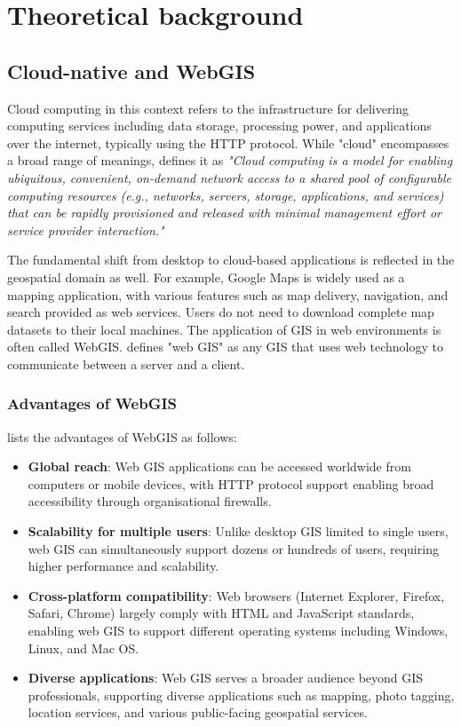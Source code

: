 \chapter{Theoretical background}
\label{chap:theoretical_background}

\section{Cloud-native and WebGIS}
\label{tb:cloud_native}

Cloud computing in this context refers to the infrastructure for delivering computing services including data storage, processing power, and applications over the internet, typically using the HTTP protocol. While "cloud" encompasses a broad range of meanings, \citet{nist_cloud_computing_2011} defines it as \emph{"Cloud computing is a model for enabling ubiquitous, convenient, on-demand network access to a shared pool of configurable computing resources (e.g., networks, servers, storage, applications, and services) that can be rapidly provisioned and released with minimal management effort or service provider interaction."}

The fundamental shift from desktop to cloud-based applications is reflected in the geospatial domain as well. For example, Google Maps is widely used as a mapping application, with various features such as map delivery, navigation, and search provided as web services. Users do not need to download complete map datasets to their local machines. The application of GIS in web environments is often called WebGIS. \citet{esri_webgis} defines "web GIS" as any GIS that uses web technology to communicate between a server and a client.

\subsection{Advantages of WebGIS}
\label{tb:advantages_of_webgis}

\citet{esri_webgis} lists the advantages of WebGIS as follows:

\begin{itemize}
  \item \textbf{Global reach}: Web GIS applications can be accessed worldwide from computers or mobile devices, with HTTP protocol support enabling broad accessibility through organisational firewalls.
  \item \textbf{Scalability for multiple users}: Unlike desktop GIS limited to single users, web GIS can simultaneously support dozens or hundreds of users, requiring higher performance and scalability.
  \item \textbf{Cross-platform compatibility}: Web browsers (Internet Explorer, Firefox, Safari, Chrome) largely comply with HTML and JavaScript standards, enabling web GIS to support different operating systems including Windows, Linux, and Mac OS.
  \item \textbf{Diverse applications}: Web GIS serves a broader audience beyond GIS professionals, supporting diverse applications such as mapping, photo tagging, location services, and various public-facing geospatial services.
\end{itemize}

